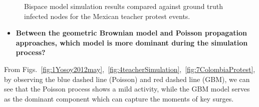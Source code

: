 \begin{figure}[ht]
\centering
{}
\caption{Bispace model simulation results compared against
ground truth infected nodes for the Mexican teacher protest events.}
\label{fig:simulation_truth}
\end{figure}




\begin{itemize}
  \item \textbf{Between the geometric Brownian model and Poisson
propagation approaches, which model
is more dominant during the simulation process?}
\end{itemize}
From Figs.~\ref{fig:1Yosoy2012may},~\ref{fig:4teacherSimulation},~\ref{fig:7ColombiaProtest}, by observing the blue dashed line (Poisson) and red dashed line (GBM), we can see that
the Poisson process shows a mild activity, while the GBM model
serves as the dominant component which can capture the moments of key
surges.
